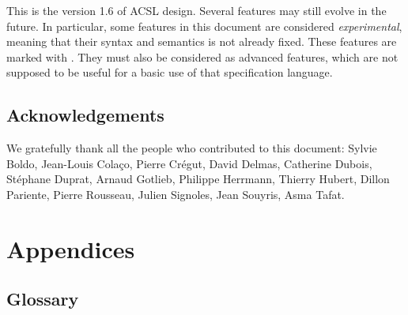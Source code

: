 \documentclass[a4paper,web]{frama-c-book}
\newcommand{\version}{1.6}
\begin{document}

This is the version \version{} of ACSL design. Several features may still
evolve in the future. In particular, some features in this document
are considered \emph{experimental}, meaning that their syntax and
semantics is not already fixed.  These features are marked with
\experimental.  They must also be considered as advanced features,
which are not supposed to be useful for a basic use of that
specification language.

\section*{Acknowledgements}

We gratefully thank all the people who contributed to this document:
Sylvie Boldo,
Jean-Louis Cola\c{c}o,
Pierre Cr\'egut,
David Delmas,
Catherine Dubois,
St\'ephane Duprat,
Arnaud Gotlieb,
Philippe Herrmann,
Thierry Hubert,
Dillon Pariente,
Pierre Rousseau,
Julien Signoles,
Jean Souyris,
Asma Tafat.









\appendix

\chapter{Appendices}
\label{chap:appendix}



\section{Glossary}
\label{sec:glossary}
\end{document}
